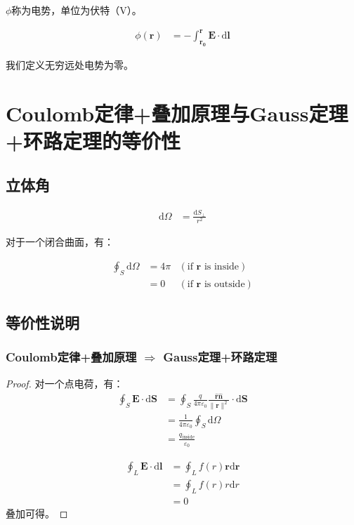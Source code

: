 \documentclass[12pt,onecolumn,a4paper]{book}
\numberwithin{table}{subsection}
\numberwithin{equation}{subsection}
\begin{document}
$\phi$称为电势，单位为伏特（V）。

\begin{align}
    \phi(\mathbf{r}) & = - \int_{\mathbf{r_0}}^{\mathbf{r}} \mathbf{E} \cdot \mathrm{d} \mathbf{l}
\end{align}

我们定义无穷远处电势为零。

\section{Coulomb定律+叠加原理与Gauss定理+环路定理的等价性}

\subsection{立体角}

\begin{align}
    \mathrm{d}\Omega & = \frac{\mathrm{d} S_{\bot}}{r^2}
\end{align}

对于一个闭合曲面，有：

\begin{align}
    \oint_{S} \mathrm{d} \Omega & = 4 \pi & (\text{if } \mathbf{r} \text{ is inside} ) \\
                                & = 0     & (\text{if } \mathbf{r} \text{ is outside})
\end{align}

\subsection{等价性说明}

\subsubsection{Coulomb定律+叠加原理 $\Rightarrow$ Gauss定理+环路定理}

\begin{proof}
    对一个点电荷，有：
    \begin{align}
        \oint_{S} \mathbf{E} \cdot \mathrm{d} \mathbf{S} & = \oint_{S} \frac{q}{4 \pi \varepsilon_0} \frac{\hat{\mathbf{r}}\hat{\mathbf{n}}}{\|\mathbf{r}\|^2} \cdot \mathrm{d} \mathbf{S} \\
                                                         & = \frac{1}{4 \pi \varepsilon_0} \oint_{S} \mathrm{d} \Omega                                                                     \\
                                                         & = \frac{q_{\text{inside}}}{\varepsilon_0}
    \end{align}

    \begin{align}
        \oint_{L} \mathbf{E} \cdot \mathrm{d} \mathbf{l} & = \oint_{L} f(r)\mathbf{r} \mathrm{d} \mathbf{r} \\
                                                         & = \oint_{L} f(r)r \mathrm{d} r                   \\
                                                         & = 0
    \end{align}
    叠加可得。
\end{proof}
\end{document}

